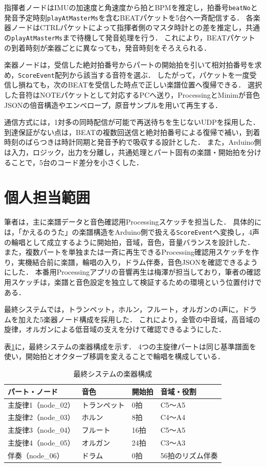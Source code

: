 \documentclass[uplatex,dvipdfmx]{jlreq}
\begin{document}
指揮者ノードはIMUの加速度と角速度から拍とBPMを推定し，拍番号\texttt{beatNo}と発音予定時刻\texttt{playAtMasterMs}を含むBEATパケットを5台へ一斉配信する．
各楽器ノードはCTRLパケットによって指揮者側のマスタ時計との差を推定し，共通の\texttt{playAtMasterMs}まで待機して発音処理を行う．
これにより，BEATパケットの到着時刻が楽器ごとに異なっても，発音時刻をそろえられる．

楽器ノードは，受信した絶対拍番号からパートの開始拍を引いて相対拍番号を求め，\texttt{ScoreEvent}配列から該当する音符を選ぶ．
したがって，パケットを一度受信し損ねても，次のBEATを受信した時点で正しい楽譜位置へ復帰できる．
選択した音符はNOTEパケットとして対応するPCへ送り，ProcessingとMinimが音色JSONの倍音構造やエンベロープ，原音サンプルを用いて再生する．

通信方式には，1対多の同時配信が可能で再送待ちを生じないUDPを採用した．
到達保証がない点は，BEATの複数回送信と絶対拍番号による復帰で補い，到着時刻のばらつきは時計同期と発音予約で吸収する設計とした．
また，Arduino側は入力，ロジック，出力を分離し，共通処理とパート固有の楽譜・開始拍を分けることで，5台のコード差分を小さくした．

\section{個人担当範囲}
筆者は，主に楽譜データと音色確認用Processingスケッチを担当した\cite{saito-work}．
具体的には，「かえるのうた」の楽譜構造をArduino側で扱える\texttt{ScoreEvent}へ変換し，4声の輪唱として成立するように開始拍，音域，音色，音量バランスを設計した．
また，複数パートを単独または一斉に再生できるProcessing確認用スケッチを作り，実機結合前に楽譜，輪唱の入り，ドラム伴奏，音色JSONを確認できるようにした．
本番用Processingアプリの音響再生は梅澤が担当しており，筆者の確認用スケッチは，楽譜と音色設定を独立して検証するための環境という位置付けである．

最終システムでは，トランペット，ホルン，フルート，オルガンの4声に，ドラムを加えた5楽器ノード構成を採用した．
これにより，金管の中音域，高音域の旋律，オルガンによる低音域の支えを分けて確認できるようにした．

表\ref{tab:parts}に，最終システムの楽器構成を示す．
4つの主旋律パートは同じ基準譜面を使い，開始拍とオクターブ移調を変えることで輪唱を構成している．

\begin{table}[tb]
\centering
\caption{最終システムの楽器構成}
\label{tab:parts}
\small
\begin{tabular}{p{33mm}p{30mm}p{25mm}p{50mm}}
\hline
パート・ノード & 音色 & 開始拍 & 音域・役割 \\
\hline
主旋律1（node\_02） & トランペット & 0拍 & C5〜A5 \\
主旋律2（node\_03） & ホルン & 8拍 & C4〜A4 \\
主旋律3（node\_04） & フルート & 16拍 & C5〜A5 \\
主旋律4（node\_05） & オルガン & 24拍 & C3〜A3 \\
伴奏（node\_06） & ドラム & 0拍 & 56拍のリズム伴奏 \\
\hline
\end{tabular}
\end{table}
\end{document}
